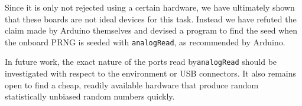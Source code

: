 \documentclass[a4paper]{article}           %
\begin{document}
Since it is only not rejected using a certain hardware, we have ultimately shown that these boards are not ideal devices for this task. Instead we have refuted the claim made by Arduino themselves and devised a program to find the seed when the onboard PRNG is seeded with \texttt{analogRead}, as recommended by Arduino. 

In future work, the exact nature of the ports read by\texttt{analogRead} should be investigated with respect to the environment or USB connectors. It also remains open to find a cheap, readily available hardware that produce random statistically unbiased random numbers quickly. 




\end{document}
